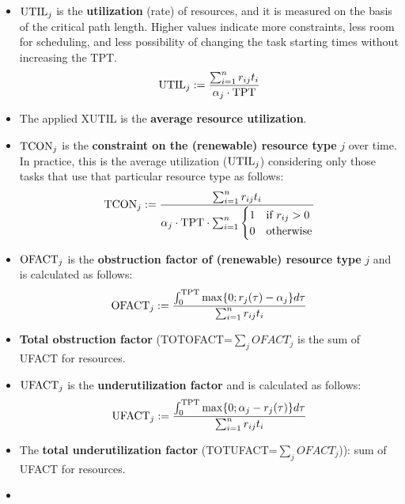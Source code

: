 \documentclass[preprint,
3p]{elsarticle} %
\begin{document}
\begin{appendices}
\begin{itemize}
\item
  \(\textnormal{UTIL}_j\) is the \textbf{utilization} (rate) of
  resources, and it is measured on the basis of the critical path
  length. Higher values indicate more constraints, less room for
  scheduling, and less possibility of changing the task starting times
  without increasing the TPT. \begin{equation}
  \label{eq:UTIL}
    \textnormal{UTIL}_{j}:=\frac{\sum_{i=1}^n r_{ij}t_{i}}{\alpha_{j} \cdot \textnormal{TPT}}
  \end{equation}
\item
  The applied XUTIL is the \textbf{average resource utilization}.
\item
  \(\textnormal{TCON}_j\) is the \textbf{constraint on the (renewable)
  resource type} \(j\) over time. In practice, this is the average
  utilization (\(\textnormal{UTIL}_j\)) considering only those tasks
  that use that particular resource type as follows: \begin{equation}
    \textnormal{TCON}_j:=\frac{\sum_{i=1}^n r_{ij}t_{i}}{\alpha_{j} \cdot \textnormal{TPT} \cdot \sum_{i=1}^n \begin{cases} 1 & \textnormal{if } r_{ij}>0 \\0 & \textnormal{otherwise}  \end{cases}}
  \end{equation}
\item
  \(\textnormal{OFACT}_j\) is the \textbf{obstruction factor of
  (renewable) resource type} \(j\) and is calculated as follows:
  \begin{equation}
    \label{eq:OFACT}
     \textnormal{OFACT}_j:=\frac{\int_{0}^\textnormal{TPT}  \max \{0;r_j(\tau)-\alpha_j \} d\tau}{\sum_{i=1}^n r_{ij}t_{i}}
   \end{equation}
\item
  \textbf{Total obstruction factor} (TOTOFACT=\(\sum_jOFACT_j\) is the
  sum of UFACT for resources.
\item
  \(\textnormal{UFACT}_j\) is the \textbf{underutilization factor} and
  is calculated as follows: \begin{equation}
     \textnormal{UFACT}_j:=\frac{\int_{0}^\textnormal{TPT}  \max \{0;\alpha_j - r_j (\tau)\} d\tau}{\sum_{i=1}^n r_{ij}t_{i}}
  \end{equation}
\item
  The \textbf{total underutilization factor}
  (TOTUFACT=\(\sum_jOFACT_j\))): sum of UFACT for resources.
\item

\end{itemize}
\end{appendices}
\end{document}
